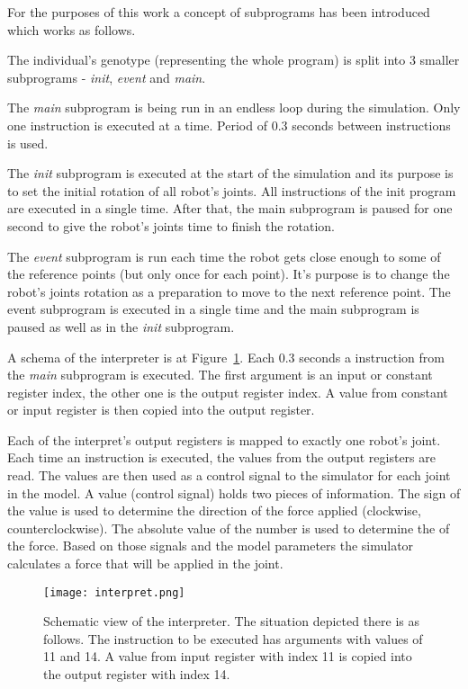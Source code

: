 \documentclass{ExcelAtFIT}
\begin{document}
For the purposes of this work a concept of subprograms has been introduced which works as follows.

The individual's genotype (representing the whole program) is split into 3 smaller subprograms - \textit{init}, \textit{event} and \textit{main}.

The \textit{main} subprogram is being run in an endless loop during the simulation.
Only one instruction is executed at a time.
Period of 0.3 seconds between instructions is used.

The \textit{init} subprogram is executed at the start of the simulation and its purpose is to set the initial rotation of all robot's joints.
All instructions of the init program are executed in a single time.
After that, the main subprogram is paused for one second to give the robot's joints time to finish the rotation.

The \textit{event} subprogram is run each time the robot gets close enough to some of the reference points (but only once for each point).
It's purpose is to change the robot's joints rotation as a preparation to move to the next reference point.
The event subprogram is executed in a single time and the main subprogram is paused as well as in the \textit{init} subprogram.

A schema of the interpreter is at Figure~\ref{fig:Interpret}.
Each 0.3 seconds a instruction from the \textit{main} subprogram is executed.
The first argument is an input or constant register index, the other one is the output register index.
A value from constant or input register is then copied into the output register.

Each of the interpret's output registers is mapped to exactly one robot's joint.
Each time an instruction is executed, the values from the output registers are read.
The values are then used as a control signal to the simulator for each joint in the model.
A value (control signal) holds two pieces of information.
The sign of the value is used to determine the direction of the force applied (clockwise, counterclockwise).
The absolute value of the number is used to determine the  of the force.
Based on those signals and the model parameters the simulator calculates a force that will be applied in the joint.


\begin{figure}[t]
	\centering
	{\texttt{[image: interpret.png]}}
	\caption{
	Schematic view of the interpreter.
	The situation depicted there is as follows.
	The instruction to be executed has arguments with values of 11 and 14.
	A value from input register with index 11 is copied into the output register with index 14.
	}
	\label{fig:Interpret}
\end{figure}
\end{document}
